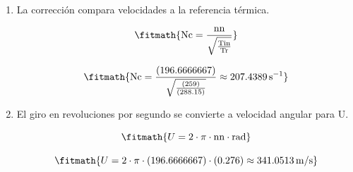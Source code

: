 \begin{enumerate}

\item La corrección compara velocidades a la referencia térmica.

\[\fitmath{\mathrm{Nc}=\frac{\mathrm{nn}}{\sqrt{\frac{\mathrm{Tin}}{\mathrm{Tr}}}}}\]

\[\fitmath{\mathrm{Nc}=\frac{(196.6666667)}{\sqrt{\frac{(259)}{(288.15)}}}\approx 207.4389\,\mathrm{s^{-1}}}\]

\item El giro en revoluciones por segundo se convierte a velocidad angular para U.

\[\fitmath{U=2\cdot \pi\cdot \mathrm{nn}\cdot \mathrm{rad}}\]

\[\fitmath{U=2\cdot \pi\cdot (196.6666667)\cdot (0.276)\approx 341.0513\,\mathrm{m/s}}\]

\end{enumerate}
